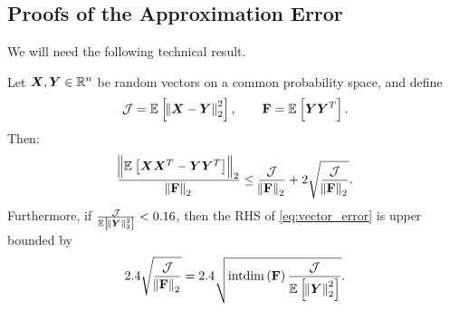 

\subsection{Proofs of 
the \name{} {Approximation Error}}
\newcommand{\vDelta}{\vectorsym{\Delta}}
\newcommand{\deltasvec}[0]{\vectorsym{\Delta}_{s}}
\newcommand{\shat}[0]{\hat{\vectorsym{s}}}
\newcommand{\svec}[0]{\vectorsym{s}}
{We will need the following technical result.}
\begin{lemma}\label{lemma:cov_vec_error}
    Let {$\Xr,\Yr \in \mathbb{R}^n$ be random vectors on a common probability space, and define \begin{equation*}
        \mathcal{J}=\expectation{\norm{\Xr-\Yr}_2^2}{}, \quad \quad  \matsym{F}=\expectation{\Yr\Yr^T}{}.
    \end{equation*}
    Then:}
    {
\begin{align}\label{eq:vector_error}
\frac{\norm{\expectation{\Xr\Xr^T -\Yr\Yr^T}{}}_2}{\norm{\matsym{F}}_2} \leq \frac{\mathcal{J}}{\norm{\matsym{F}}_2}+2\sqrt{\frac{\mathcal{J}}{\norm{\matsym{F}}_2}}.
\end{align}
Furthermore, if $\frac{\mathcal{J}}{\expectation{\norm{\Yr}_2^2}{}} < {0.16}$, then the RHS of \eqref{eq:vector_error} is upper bounded by
\begin{equation} \label{eq:vector_error-simplified}
2.4\sqrt{\frac{\mathcal{J}}{\norm{\matsym{F}}_2}} =
2.4\sqrt{\intdim\brackets{\F}\frac{\mathcal{J}}{\expectation{\norm{\Yr}_2^2}{}}}.
\end{equation}
    }    
\end{lemma}
